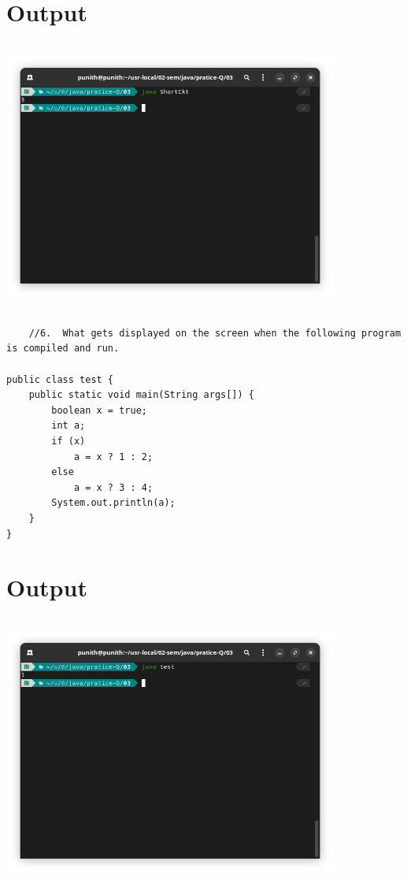 \documentclass{article}
\begin{document}
 \section*{Output}
\includegraphics[width=11cm, height=9cm]{./images/02.png}


 \begin{lstlisting}
    //6.  What gets displayed on the screen when the following program is compiled and run. 

public class test {
    public static void main(String args[]) {
        boolean x = true;
        int a;
        if (x)
            a = x ? 1 : 2;
        else
            a = x ? 3 : 4;
        System.out.println(a);
    }
}

 \end{lstlisting}

 \section*{Output}
 \includegraphics[width=11cm, height=9cm]{./images/03.png}
\end{document}
